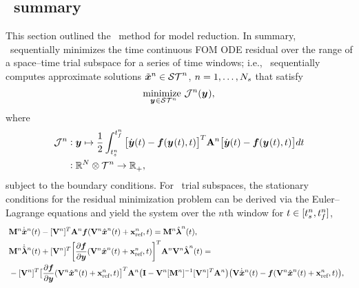 



\subsection{\methodAcronym\ summary}
This section outlined the \methodAcronym\ method for model reduction. In summary, \methodAcronym\ sequentially minimizes the time continuous FOM ODE residual over the range of a space--time trial subspace for a series of time windows; i.e.,  
\methodAcronym\ sequentially computes approximate solutions
$\approxstateArgnt{n}\in\stspace^n$, $n=1,\ldots,\nslabs$ that satisfy
\begin{equation*}
\underset{\stateyArgnt{} \in \stspace^n}{\text{minimize } }
\mathcal{J}^n(\stateyArgnt{}),
\end{equation*}
where
\begin{align*}
\mathcal{J}^n &\vcentcolon \statey \mapsto
\frac{1}{2} \int_{\timeStartArg{n}}^{\timeEndArg{n}} \big[ \dot{\statey}(t)
- \velocity(\stateyArg{}{t},t) \big]^T \stweightingMatArg{n} \big[
\dot{\statey}(t) - \velocity(\stateyArg{}{t},t) \big] d t \\
&\vcentcolon \RR{\fomdim}\otimes \timeSpaceArg{n} \rightarrow
\RRplus,
\end{align*}
subject to the boundary conditions. For \spatialAcronym\ trial subspaces, the stationary conditions for the residual minimization problem can be derived via the Euler--Lagrange equations and yield the system over the $n$th window for $t \in [\timeStartArg{n},\timeEndArg{n}]$,
\begin{align*}\
&\massArg{n}  \genstateDotArg{n}{t}  -  \basisspaceTArg{n}
\stweightingMatArgt{n}{t} \velocity(\veloargsromn) =  \massArg{n} \adjointArg{n}{t} , \\
 &\massArg{n} \adjointDotArg{n}{t}  + \basisspaceTArg{n} \bigg[\frac{\partial
\velocity}{\partial \statey} (\veloargsromn) \bigg]^T \stweightingMatArgt{n}{t} \basisspaceArg{n}
 \adjointArg{n}{t} = \nonumber \\ 
&-\basisspaceTArg{n} \big[
\frac{\partial \velocity}{\partial \statey}(\veloargsromn) \big]^T \stweightingMatArgt{n}{t} \big( \mathbf{I} -
\basisspaceArg{n} [\massArg{n}]^{-1} \basisspaceTArg{n} \stweightingMatArgt{n}{t} \big)
 \big( \basisspace \genstateDotArg{n}{t}  -
\velocity(\veloargsromn) \big),  &
\end{align*} 
